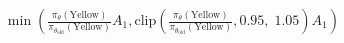 \documentclass[preview]{standalone}
\begin{document}
\begin{align*}
\min \left(\frac{\pi_\theta(\text{Yellow})} {\pi_{\theta_{\text{old}}}(\text{Yellow})} A_1, \text{clip} \left(\frac{\pi_\theta(\text{Yellow})} {\pi_{\theta_{\text{old}}}(\text{Yellow})},0.95,\; 1.05\right) A_1\right)
\end{align*}
\end{document}
